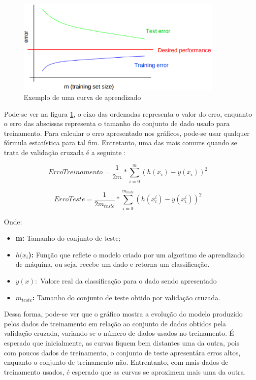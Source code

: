\begin{figure}[h]
  \centering
  \includegraphics[width=0.9\textwidth]{figuras/curva_aprendizado.eps}
  \caption{Exemplo de uma curva de aprendizado \cite{1_ng} }
  \label{fig:curva_aprendizado}
\end{figure}

Pode-se ver na figura \ref{fig:curva_aprendizado}, o eixo das ordenadas representa o valor do erro, enquanto
o erro das abscissas representa o tamanho do conjunto de dado usado para treinamento. Para calcular
o erro apresentado nos gráficos, pode-se usar qualquer fórmula estatística para tal fim. Entretanto, uma das mais comuns
quando se trata de validação cruzada é a seguinte \cite{1_ng}:

\begin{equation}
ErroTreinamento = \frac{1}{2m}*\sum_{i=0}^{m}(h(x_{i}) - y(x_{i}))^2
\end{equation}

\begin{equation}
ErroTeste = \frac{1}{2m_{teste}}*\sum_{i=0}^{m_{teste}}(h(x_{t}^{i}) - y(x_{t}^{i}))^2
\end{equation}

Onde:

\begin{itemize}
    \item \textbf{m: } Tamanho do conjunto de teste;
    \item \textbf{$h(x_{i}$): } Função que reflete o modelo criado por um algoritmo de aprendizado de máquina, ou seja, recebe um dado e retorna um classificação.
    \item \textbf{$y(x): $} Valore real da classificação para o dado sendo apresentado
    \item \textbf{$m_{teste}$: } Tamanho do conjunto de teste obtido por validação cruzada.
\end{itemize}

Dessa forma, pode-se ver que o gráfico mostra a evolução do modelo produzido pelos dados de treinamento
em relação ao conjunto de dados obtidos pela validação cruzada, variando-se o número de dados usados no treinamento. É esperado que inicialmente, as curvas fiquem bem distantes
uma da outra, pois com poucos dados de treinamento, o conjunto de teste apresentára erros altos, enquanto o conjunto de treinamento não. Entrentanto, com mais dados de treinamento
usados, é esperado que as curvas se aproximem mais uma da outra.

